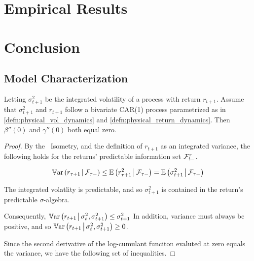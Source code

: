 \documentclass[11pt, letterpaper, twoside, final]{article}
\begin{document}
\section{Empirical Results}

\section{Conclusion}

\clearpage

{}
\printbibliography
\clearpage

\begin{appendices}


\section{Model Characterization}\label{app:model_characterization}

\begin{lemma}
    \label{lemma:linearity_of_physical_functions}
    Letting $\sigma^2_{t+1}$ be the integrated volatility of a process with return $r_{t+1}$.
    Assume that $\sigma^2_{t+1}$ and $r_{t+1}$ follow a bivariate CAR(1) process parametrized as in
    \cref{defn:physical_vol_dynamics} and \cref{defn:physical_return_dynamics}. 
    Then $\beta''(0)$ and $\gamma''(0)$ both equal zero.
\end{lemma}

\begin{proof}
    By the \Ito\ Isometry, and the definition of $r_{t+1}$ as an integrated variance, the following holds for the
    returns' predictable information set $\mathcal{F}^r_{t-}$.  

    \begin{equation}
        \operatorname{\mathbb{V}ar}\left(r_{\tau+1}\,\middle\vert\, \mathcal{F}_{\tau-}\right) \leq \operatorname{\mathbb{E}}\left(r^2_{\tau+1} \,\middle\vert\, \mathcal{F}_{\tau-}\right) 
        = \operatorname{\mathbb{E}}\left(\sigma^2_{t+1}\,\middle\vert\, \mathcal{F}_{\tau-}\right)
    \end{equation}

    The integrated volatlity is predictable, and so $\sigma^2_{t+1}$ is contained in the return's predictable
    $\sigma$-algebra. 

    Consequently, $\operatorname{\mathbb{V}ar}\left(r_{t+1} \,\middle\vert\, \sigma^2_t, \sigma^2_{t+1}\right) \leq \sigma^2_{t+1}$
    In addition, variance must always be positive, and so $\operatorname{\mathbb{V}ar}\left(r_{t+1} \,\middle\vert\, \sigma^2_t,
    \sigma^2_{t+1}\right) \geq 0$.

    Since the second derivative of the log-cumulant funciton evaluted at zero equals the variance, we have the
    following set of inequalities.


\end{proof}
\end{appendices}
\end{document}
